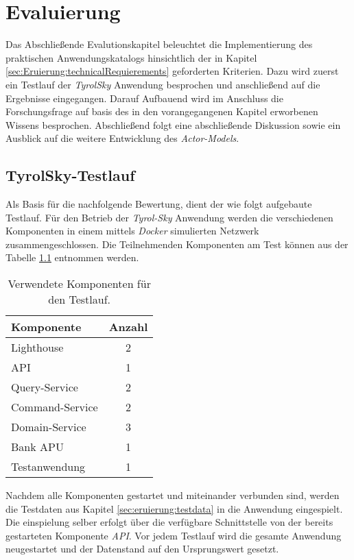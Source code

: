 \chapter{Evaluierung} \label{cha:evaluation}
Das Abschließende Evalutionskapitel beleuchtet die Implementierung des praktischen Anwendungskatalogs hinsichtlich der in Kapitel \ref{sec:Eruierung:technicalRequierements} geforderten Kriterien. Dazu wird zuerst ein Testlauf der \textit{TyrolSky} Anwendung besprochen und anschließend auf die Ergebnisse eingegangen. Darauf Aufbauend wird im Anschluss die Forschungsfrage auf basis des in den vorangegangenen Kapitel erworbenen Wissens besprochen. Abschließend folgt eine abschließende Diskussion sowie ein Ausblick auf die weitere Entwicklung des \textit{Actor-Models}. 

\section{TyrolSky-Testlauf}
Als Basis für die nachfolgende Bewertung, dient der wie folgt aufgebaute Testlauf. Für den Betrieb der \textit{Tyrol-Sky} Anwendung werden die verschiedenen Komponenten in einem mittels \textit{Docker} simulierten Netzwerk zusammengeschlossen. Die Teilnehmenden Komponenten am Test können aus der Tabelle \ref{tab:evaluation:testStage} entnommen werden. \\
\begin{table}
    \centering
    \begin{tabular}{lc}
        Komponente       &   Anzahl  \\ \hline
        Lighthouse       &   2       \\
        API              &   1       \\
        Query-Service    &   2       \\
        Command-Service  &   2       \\
        Domain-Service   &   3       \\
        Bank APU         &   1       \\
        Testanwendung    &   1
    \end{tabular}
    \caption{Verwendete Komponenten für den Testlauf.}
    \label{tab:evaluation:testStage}
\end{table}
Nachdem alle Komponenten gestartet und miteinander verbunden sind, werden die Testdaten aus Kapitel \ref{sec:eruierung:testdata} in die Anwendung eingespielt. Die einspielung selber erfolgt über die verfügbare Schnittstelle von der bereits gestarteten Komponente \textit{API}. Vor jedem Testlauf wird die gesamte Anwendung neugestartet und der Datenstand auf den Ursprungswert gesetzt. \\

